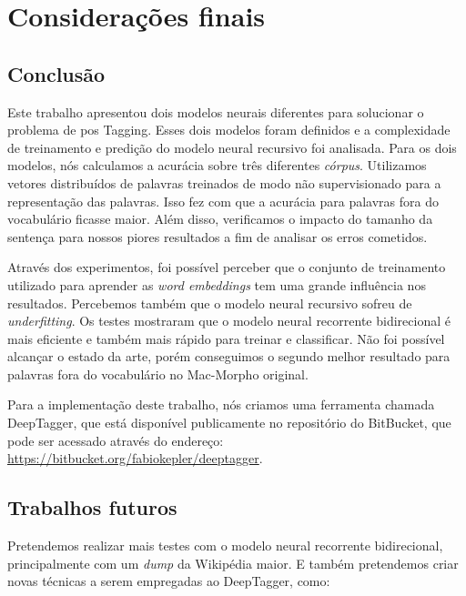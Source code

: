 \chapter{Considerações finais}\label{consideracoesfinais}

\section{Conclusão}

Este trabalho apresentou dois modelos neurais diferentes para solucionar o problema de \ac{pos} Tagging. Esses dois modelos foram definidos e a complexidade de treinamento e predição do modelo neural recursivo foi analisada. Para os dois modelos, nós calculamos a acurácia sobre três diferentes \textit{córpus}. Utilizamos vetores distribuídos de palavras treinados de modo não supervisionado para a representação das palavras. Isso fez com que a acurácia para palavras fora do vocabulário ficasse maior. Além disso, verificamos o impacto do tamanho da sentença para nossos piores resultados a fim de analisar os erros cometidos. 

Através dos experimentos, foi possível perceber que o conjunto de treinamento utilizado para aprender as \textit{word embeddings} tem uma grande influência nos resultados. Percebemos também que o modelo neural recursivo sofreu de \textit{underfitting}. Os testes mostraram que o modelo neural recorrente bidirecional é mais eficiente e também mais rápido para treinar e classificar. Não foi possível alcançar o estado da arte, porém conseguimos o segundo melhor resultado para palavras fora do vocabulário no Mac-Morpho original. 

Para a implementação deste trabalho, nós criamos uma ferramenta chamada DeepTagger, que está disponível publicamente no repositório do BitBucket, que pode ser acessado através do endereço: \url{https://bitbucket.org/fabiokepler/deeptagger}. 


\section{Trabalhos futuros}

Pretendemos realizar mais testes com o modelo neural recorrente bidirecional, principalmente com um \textit{dump} da Wikipédia maior. E também pretendemos criar novas técnicas a serem empregadas ao DeepTagger, como:


